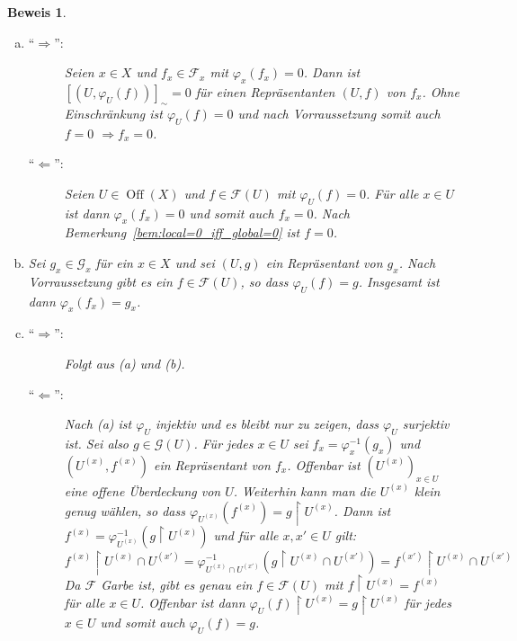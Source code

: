\documentclass[a4paper,oneside]{scrbook}
\theoremstyle{break}
\theoremstyle{nonumberbreak}
\theoremstyle{nonumberplain}
\newtheorem{Bew}{Beweis}
\theoremstyle{break}
\newcommand{\Off}{%
	\ensuremath{\operatorname{Off}}%
}
\renewcommand{\phi}{%
	\ensuremath{\varphi}%
}
\begin{document}
\begin{Bew}
	\begin{enumerate}[(a)]
	\item
		\begin{description}
			\item[ "`$\Rightarrow$"':] Seien $x \in X$ und  $f_x \in \mathcal{F}_x$ mit $\phi_x(f_x) = 0$.
				Dann ist $[ (U, \phi_U(f) ) ]_{\sim} = 0$ für einen Repräsentanten $(U,f)$ von $f_x$.
				Ohne Einschränkung ist $\phi_U(f) = 0$ und nach Vorraussetzung somit auch $f = 0$ $\Rightarrow f_x = 0$.
			\item["`$\Leftarrow$"':] Seien $U \in \Off(X)$ und $f \in \mathcal{F}(U)$ mit $\phi_{U}(f) = 0$.
				Für alle $x\in U$ ist dann $\phi_x(f_x) = 0$ und somit auch $f_x = 0$.
				Nach Bemerkung~\ref{bem:local=0_iff_global=0} ist $f = 0$.
		\end{description}

	\item Sei $g_x \in \mathcal{G}_x$ für ein $x \in X$ und sei $(U,g)$ ein Repräsentant von $g_x$.
		Nach Vorraussetzung gibt es ein $f \in \mathcal{F}(U)$, so dass $\phi_U(f) = g$. Insgesamt ist dann $\phi_x(f_x) = g_x$.
	\item 
		\begin{description}
			\item[ "`$\Rightarrow$"':] Folgt aus (a) und (b).
			\item[ "`$\Leftarrow$"':] Nach (a) ist $\phi_{U}$ injektiv und es bleibt nur zu zeigen, dass $\phi_{U}$ surjektiv ist.
				Sei also $ g\in \mathcal{G}(U)$.
				Für jedes $x \in U$ sei $f_x = \phi_x^{-1}(g_x)$ und $(U^{(x)}, f^{(x)} )$ ein Repräsentant von $f_x$.
				Offenbar ist $\left(  U^{(x)} \right)_{x \in U}$ eine offene Überdeckung von $U$.
				Weiterhin kann man die $U^{(x)}$ klein genug wählen, so dass $\phi_{U^{(x)}}( f^{(x)} ) = g \restriction U^{(x)}$.
				Dann ist $f^{(x)} = \phi_{U^{(x)}}^{-1}( g \restriction U^{(x)} )$ und für alle $x,x' \in U$ gilt:
				\[ f^{(x)}\restriction U^{(x)} \cap U^{(x')} = \phi_{U^{(x)} \cap U^{(x')}}^{-1}( g \restriction U^{(x)} \cap U^{(x')} ) = f^{(x')} \restriction U^{(x)} \cap U^{(x')} \]
				Da $\mathcal{F}$ Garbe ist, gibt es genau ein $f \in \mathcal{F}(U)$ mit $f \restriction U^{(x)} = f^{(x)}$ für alle $x \in U$. Offenbar ist dann $\phi_U(f) \restriction U^{(x)} = g \restriction U^{(x)}$ für jedes $x \in U$ und somit auch $\phi_U(f) = g$.
		\end{description}
	\end{enumerate}
\end{Bew}
\end{document}
